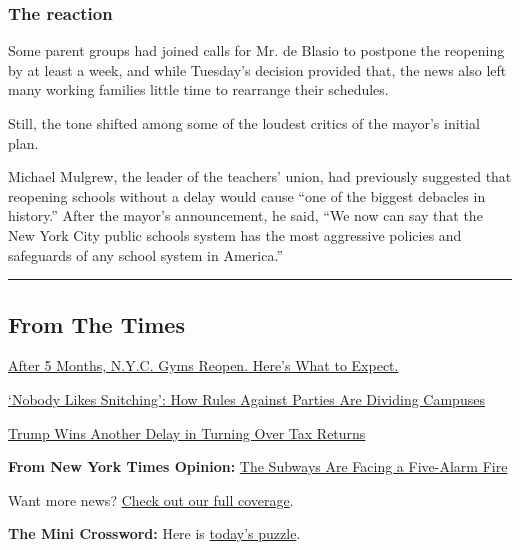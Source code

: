 \hypertarget{the-reaction}{%
\subsubsection{The reaction}\label{the-reaction}}

Some parent groups had joined calls for Mr. de Blasio to postpone the
reopening by at least a week, and while Tuesday's decision provided
that, the news also left many working families little time to rearrange
their schedules.

Still, the tone shifted among some of the loudest critics of the mayor's
initial plan.

Michael Mulgrew, the leader of the teachers' union, had previously
suggested that reopening schools without a delay would cause ``one of
the biggest debacles in history.'' After the mayor's announcement, he
said, ``We now can say that the New York City public schools system has
the most aggressive policies and safeguards of any school system in
America.''

\begin{center}\rule{0.5\linewidth}{\linethickness}\end{center}

\hypertarget{from-the-times}{%
\subsection{From The Times}\label{from-the-times}}

\href{https://www.nytimes3xbfgragh.onion/2020/09/02/nyregion/nyc-gyms-reopen.html}{After
5 Months, N.Y.C. Gyms Reopen. Here's What to Expect.}

\href{https://www.nytimes3xbfgragh.onion/2020/09/02/nyregion/colleges-universities-covid-parties.html}{`Nobody
Likes Snitching': How Rules Against Parties Are Dividing Campuses}

\href{https://www.nytimes3xbfgragh.onion/2020/09/01/nyregion/trump-taxes-vance-lawsuit.html}{Trump
Wins Another Delay in Turning Over Tax Returns}

\textbf{From New York Times Opinion:}
\href{https://www.nytimes3xbfgragh.onion/2020/09/01/opinion/new-york-subway-coronavirus.html}{The
Subways Are Facing a Five-Alarm Fire}

Want more news?
\href{https://www.nytimes3xbfgragh.onion/section/nyregion}{Check out our
full coverage}.

\textbf{The Mini Crossword:} Here is
\href{https://www.nytimes3xbfgragh.onion/crosswords/game/mini}{today's
puzzle}.

